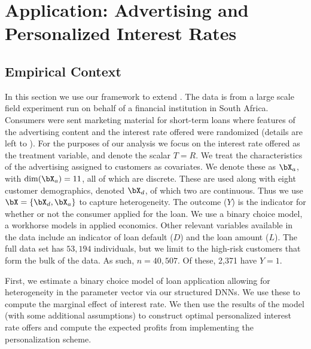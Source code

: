 \documentclass[12pt]{article}
\numberwithin{equation}{section}
\theoremstyle{definition}
\begin{document}
\section{Application: Advertising and Personalized Interest Rates}
	\label{sec:application}


\subsection{Empirical Context}

In this section we use our framework to extend \cite{Bertrand-etal2010_QJE}. The data is from a large scale field experiment run on behalf of a financial institution in South Africa. Consumers were sent marketing material for short-term loans where features of the advertising content and the interest rate offered were randomized (details are left to \cite{Bertrand-etal2010_QJE}). For the purposes of our analysis we focus on the interest rate offered as the treatment variable, and denote the scalar $T = R$. We treat the characteristics of the advertising assigned to customers as covariates. We denote these as $\bX_a$, with $\dim(\bX_a) = 11$, all of which are discrete. These are used along with eight customer demographics, denoted $\bX_d$, of which two are continuous. Thus we use $\bX=\{\bX_d,\bX_a\}$ to capture heterogeneity. The outcome ($Y$) is the indicator for whether or not the consumer applied for the loan. We use a binary choice model, a workhorse models in applied economics. Other relevant variables available in the data include an indicator of loan default ($D$) and the loan amount ($L$). The full data set has $53,194$ individuals, but we limit to the high-risk customers that form the bulk of the data. As such, $n=40,507$. Of these, 2,371 have $Y=1$.

First, we estimate a binary choice model of loan application allowing for heterogeneity in the parameter vector via our structured DNNs. We use these to compute the marginal effect of interest rate. We then use the results of the model (with some additional assumptions) to construct optimal personalized interest rate offers and compute the expected profits from implementing the personalization scheme. 



\end{document}
